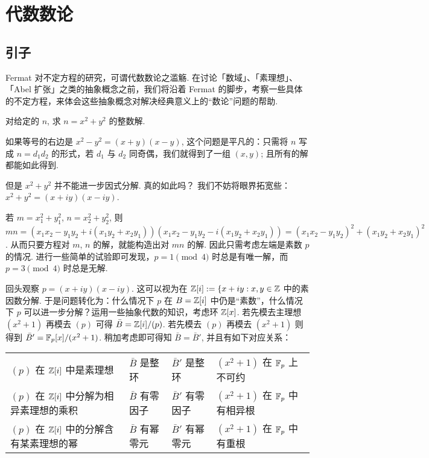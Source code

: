 \chapter{代数数论}

\section{引子}
Fermat 对不定方程的研究，可谓代数数论之滥觞.  在讨论「数域」、「素理想」、「Abel 扩张」之类的抽象概念之前，我们将沿着 Fermat 的脚步，考察一些具体的不定方程，来体会这些抽象概念对解决经典意义上的“数论”问题的帮助.

\begin{question}
  对给定的 $n$, 求 $n = x^2 + y^2$ 的整数解.
\end{question}


如果等号的右边是 $x^2 - y^2 = (x+y)(x-y)$, 这个问题是平凡的：只需将 $n$ 写成 $n = d_1d_2$ 的形式，若 $d_1$ 与 $d_2$ 同奇偶，我们就得到了一组 $(x, y)$; 且所有的解都能如此得到.

但是 $x^2 + y^2$ 并不能进一步因式分解.  {\kaishu 真的如此吗？}  我们不妨将眼界拓宽些：$x^2 + y^2 = (x+iy)(x-iy)$.

若 $m = x_1^2 + y_1^2$, $n = x_2^2 + y_2^2$, 则 $mn = (x_1x_2-y_1y_2 + i(x_1y_2+x_2y_1))(x_1x_2-y_1y_2 - i(x_1y_2+x_2y_1)) = (x_1x_2-y_1y_2)^2 + (x_1y_2+x_2y_1)^2$.  从而只要方程对 $m$, $n$ 的解，就能构造出对 $mn$ 的解.  因此只需考虑左端是素数 $p$ 的情况.  进行一些简单的试验即可发现，$p = 1 \pmod 4$ 时总是有唯一解，而 $p = 3 \pmod 4$ 时总是无解.

回头观察 $p = (x+iy)(x-iy)$.  这可以视为在 $\mathbb Z[i] := \{x+iy : x, y \in \mathbb Z$ 中的素因数分解.  于是问题转化为：什么情况下 $p$ 在 $B = \mathbb Z[i]$ 中仍是“素数”，什么情况下 $p$ 可以进一步分解？运用一些抽象代数的知识，考虑环 $\mathbb Z[x]$.  若先模去主理想 $(x^2+1)$ 再模去 $(p)$ 可得 $\bar B = \mathbb Z[i]/(p)$.  若先模去 $(p)$ 再模去 $(x^2+1)$ 则得到 $\bar B' = \mathbb F_p[x]/(x^2+1)$.  稍加考虑即可得知 $\bar B = \bar B'$, 并且有如下对应关系：

\begin{table}[h]
  \begin{tabular}{llll}
    $(p)$ 在 $\mathbb Z[i]$ 中是素理想 & $\bar B$ 是整环 & $\bar B'$ 是整环 & $(x^2+1)$ 在 $\mathbb F_p$ 上不可约 \\
    $(p)$ 在 $\mathbb Z[i]$ 中分解为相异素理想的乘积 & $\bar B$ 有零因子 & $\bar B'$ 有零因子 & $(x^2+1)$ 在 $\mathbb F_p$ 中有相异根 \\
    $(p)$ 在 $\mathbb Z[i]$ 中的分解含有某素理想的幂 & $\bar B$ 有幂零元 & $\bar B'$ 有幂零元 & $(x^2+1)$ 在 $\mathbb F_p$ 中有重根
  \end{tabular}
\end{table}

